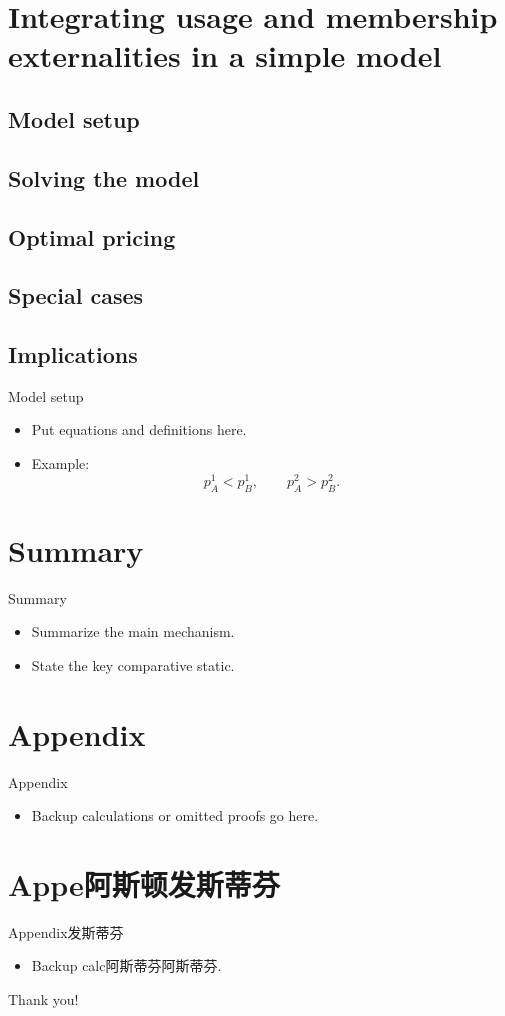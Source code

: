 \documentclass[aspectratio=43]{beamer}
\begin{document}
\section{Integrating usage and membership externalities in a simple model}
\subsection{Model setup}
\subsection{Solving the model}
\subsection{Optimal pricing}
\subsection{Special cases}
\subsection{Implications}

\begin{frame}{Model setup}
  \begin{itemize}
    \item Put equations and definitions here.
    \item Example:
      \[
        p_A^1 < p_B^1,\qquad p_A^2 > p_B^2.
      \]
  \end{itemize}
\end{frame}

\section{Summary}
\begin{frame}{Summary}
  \begin{itemize}
    \item Summarize the main mechanism.
    \item State the key comparative static.
  \end{itemize}
\end{frame}

\section{Appendix}
\begin{frame}{Appendix}
  \begin{itemize}
    \item Backup calculations or omitted proofs go here.
  \end{itemize}
\end{frame}

\section{Appe阿斯顿发斯蒂芬}
\begin{frame}{Appendix发斯蒂芬}
  \begin{itemize}
    \item Backup calc阿斯蒂芬阿斯蒂芬.
  \end{itemize}
\end{frame}



\begin{frame}[plain]
  \centering
  \vspace{3.1cm}
  {\Huge Thank you!}
\end{frame}
\end{document}
